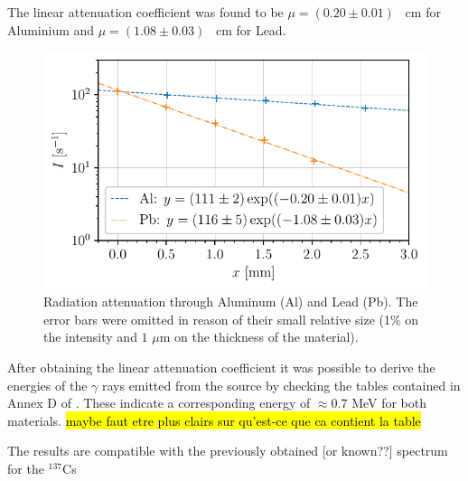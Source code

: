 The linear attenuation coefficient was found to be $\mu = (0.20 \pm 0.01)$ \unit{\per\cm} for Aluminium
and $\mu = (1.08 \pm 0.03)$ \unit{\per\cm} for Lead.
\begin{figure}[htbp]
    \centering
    \includegraphics[scale=1]{figures/attenuation_coefficient.pdf}
    \caption{Radiation attenuation through Aluminum (Al) and Lead (Pb). 
             The error bars were omitted in reason of their small relative size 
             (1\% on the intensity and $1$ $\mu$m on the thickness of the material).}
    \label{fig:attenuation_coefficient}
\end{figure}

After obtaining the linear attenuation coefficient it was possible to derive the energies of the $\gamma$ rays emitted from the source by checking the tables contained in Annex D of \cite{notice_generale}.
These indicate a corresponding energy of $\approx 0.7$ MeV for both materials.
\hl{maybe faut etre plus clairs sur qu'est-ce que ca contient la table}

The results are compatible with the previously obtained [or known??] spectrum for the $^{137}$Cs